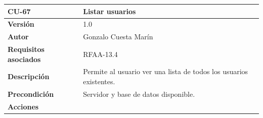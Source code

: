 \documentclass[
]{article}
\begin{document}
\begin{longtable}[]{@{}ll@{}}
\toprule
\begin{minipage}[b]{0.20\columnwidth}\raggedright
\textbf{CU-67}\strut
\end{minipage} & \begin{minipage}[b]{0.74\columnwidth}\raggedright
\textbf{Listar usuarios}\strut
\end{minipage}\tabularnewline
\midrule
\endhead
\begin{minipage}[t]{0.20\columnwidth}\raggedright
\textbf{Versión}\strut
\end{minipage} & \begin{minipage}[t]{0.74\columnwidth}\raggedright
1.0\strut
\end{minipage}\tabularnewline
\begin{minipage}[t]{0.20\columnwidth}\raggedright
\textbf{Autor}\strut
\end{minipage} & \begin{minipage}[t]{0.74\columnwidth}\raggedright
Gonzalo Cuesta Marín\strut
\end{minipage}\tabularnewline
\begin{minipage}[t]{0.20\columnwidth}\raggedright
\textbf{Requisitos asociados}\strut
\end{minipage} & \begin{minipage}[t]{0.74\columnwidth}\raggedright
RFAA-13.4\strut
\end{minipage}\tabularnewline
\begin{minipage}[t]{0.20\columnwidth}\raggedright
\textbf{Descripción}\strut
\end{minipage} & \begin{minipage}[t]{0.74\columnwidth}\raggedright
Permite al usuario ver una lista de todos los usuarios existentes.\strut
\end{minipage}\tabularnewline
\begin{minipage}[t]{0.20\columnwidth}\raggedright
\textbf{Precondición}\strut
\end{minipage} & \begin{minipage}[t]{0.74\columnwidth}\raggedright
Servidor y base de datos disponible.\strut
\end{minipage}\tabularnewline
\begin{minipage}[t]{0.20\columnwidth}\raggedright
\textbf{Acciones}\strut
\end{minipage} & \begin{minipage}[t]{0.74\columnwidth}\raggedright
\begin{enumerate}

\end{enumerate}
\end{minipage}
\end{longtable}
\end{document}
